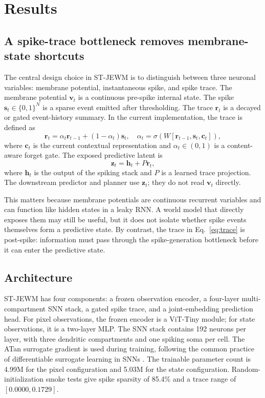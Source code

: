 \documentclass[10pt]{article}
\newcommand{\method}{ST-JEWM}
\newcommand{\trace}{\mathbf{r}}
\newcommand{\spike}{\mathbf{s}}
\newcommand{\mem}{\mathbf{v}}
\newcommand{\latent}{\mathbf{z}}
\begin{document}
\section{Results}

\subsection{A spike-trace bottleneck removes membrane-state shortcuts}

The central design choice in \method{} is to distinguish between three neuronal variables: membrane potential, instantaneous spike, and spike trace. The membrane potential $\mem_t$ is a continuous pre-spike internal state. The spike $\spike_t \in \{0,1\}^N$ is a sparse event emitted after thresholding. The trace $\trace_t$ is a decayed or gated event-history summary. In the current implementation, the trace is defined as
\begin{equation}
    \trace_t = \alpha_t \trace_{t-1} + (1-\alpha_t)\spike_t,
    \quad
    \alpha_t = \sigma\left(W[\trace_{t-1}, \spike_t, \mathbf{c}_t]\right),
    \label{eq:trace}
\end{equation}
where $\mathbf{c}_t$ is the current contextual representation and $\alpha_t\in(0,1)$ is a content-aware forget gate. The exposed predictive latent is
\begin{equation}
    \latent_t = \mathbf{h}_t + P\trace_t,
\end{equation}
where $\mathbf{h}_t$ is the output of the spiking stack and $P$ is a learned trace projection. The downstream predictor and planner use $\latent_t$; they do not read $\mem_t$ directly.

This matters because membrane potentials are continuous recurrent variables and can function like hidden states in a leaky RNN. A world model that directly exposes them may still be useful, but it does not isolate whether spike events themselves form a predictive state. By contrast, the trace in Eq.~\ref{eq:trace} is post-spike: information must pass through the spike-generation bottleneck before it can enter the predictive state.

\subsection{Architecture}

\method{} has four components: a frozen observation encoder, a four-layer multi-compartment SNN stack, a gated spike trace, and a joint-embedding prediction head. For pixel observations, the frozen encoder is a ViT-Tiny module; for state observations, it is a two-layer MLP. The SNN stack contains 192 neurons per layer, with three dendritic compartments and one spiking soma per cell. The ATan surrogate gradient is used during training, following the common practice of differentiable surrogate learning in SNNs \citep{surrogate_snn}. The trainable parameter count is 4.99M for the pixel configuration and 5.03M for the state configuration. Random-initialization smoke tests give spike sparsity of 85.4\% and a trace range of $[0.0000,0.1729]$.
\end{document}
